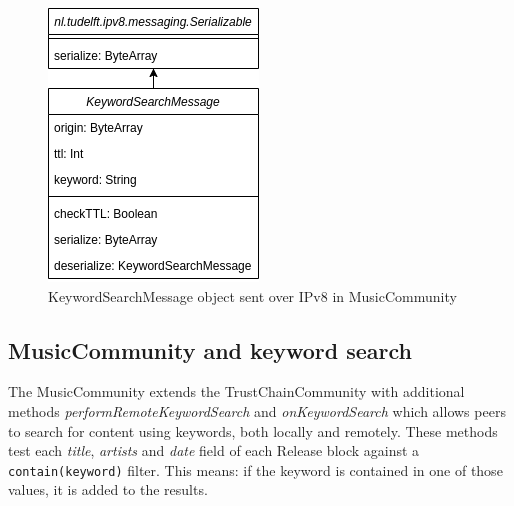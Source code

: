 \begin{figure}
        \includegraphics[width=\linewidth]{implementation/keyword-search-message.png}
        \caption{KeywordSearchMessage object sent over IPv8 in MusicCommunity}
        \label{fig:keyword-search-message}
    \endminipage\hfill
    \endminipage
\end{figure}
\subsection{MusicCommunity and keyword search}
\label{sec:searching-musiccommunity-impl}
The MusicCommunity extends the TrustChainCommunity with additional methods \textit{performRemoteKeywordSearch} and \textit{onKeywordSearch} which allows peers to search for content using keywords, both locally and remotely. These methods test each \textit{title}, \textit{artists} and \textit{date} field of each Release block against a \verb|contain(keyword)| filter. This means: if the keyword is contained in one of those values, it is added to the results.

